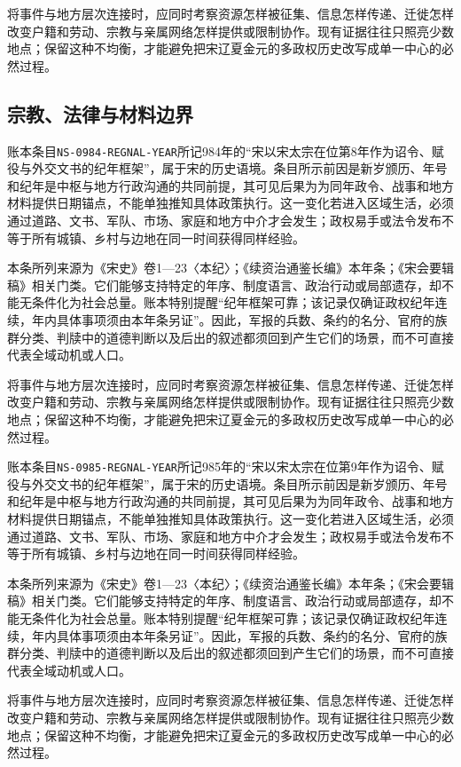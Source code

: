 将事件与地方层次连接时，应同时考察资源怎样被征集、信息怎样传递、迁徙怎样改变户籍和劳动、宗教与亲属网络怎样提供或限制协作。现有证据往往只照亮少数地点；保留这种不均衡，才能避免把宋辽夏金元的多政权历史改写成单一中心的必然过程。

\subsection{宗教、法律与材料边界}

账本条目\texttt{NS-0984-REGNAL-YEAR}所记984年的“宋以宋太宗在位第8年作为诏令、赋役与外交文书的纪年框架”，属于宋的历史语境。条目所示前因是新岁颁历、年号和纪年是中枢与地方行政沟通的共同前提，其可见后果为为同年政令、战事和地方材料提供日期锚点，不能单独推知具体政策执行。这一变化若进入区域生活，必须通过道路、文书、军队、市场、家庭和地方中介才会发生；政权易手或法令发布不等于所有城镇、乡村与边地在同一时间获得同样经验。

本条所列来源为《宋史》卷1—23〈本纪〉；《续资治通鉴长编》本年条；《宋会要辑稿》相关门类。它们能够支持特定的年序、制度语言、政治行动或局部遗存，却不能无条件化为社会总量。账本特别提醒“纪年框架可靠；该记录仅确证政权纪年连续，年内具体事项须由本年条另证”。因此，军报的兵数、条约的名分、官府的族群分类、判牍中的道德判断以及后出的叙述都须回到产生它们的场景，而不可直接代表全域动机或人口。

将事件与地方层次连接时，应同时考察资源怎样被征集、信息怎样传递、迁徙怎样改变户籍和劳动、宗教与亲属网络怎样提供或限制协作。现有证据往往只照亮少数地点；保留这种不均衡，才能避免把宋辽夏金元的多政权历史改写成单一中心的必然过程。

账本条目\texttt{NS-0985-REGNAL-YEAR}所记985年的“宋以宋太宗在位第9年作为诏令、赋役与外交文书的纪年框架”，属于宋的历史语境。条目所示前因是新岁颁历、年号和纪年是中枢与地方行政沟通的共同前提，其可见后果为为同年政令、战事和地方材料提供日期锚点，不能单独推知具体政策执行。这一变化若进入区域生活，必须通过道路、文书、军队、市场、家庭和地方中介才会发生；政权易手或法令发布不等于所有城镇、乡村与边地在同一时间获得同样经验。

本条所列来源为《宋史》卷1—23〈本纪〉；《续资治通鉴长编》本年条；《宋会要辑稿》相关门类。它们能够支持特定的年序、制度语言、政治行动或局部遗存，却不能无条件化为社会总量。账本特别提醒“纪年框架可靠；该记录仅确证政权纪年连续，年内具体事项须由本年条另证”。因此，军报的兵数、条约的名分、官府的族群分类、判牍中的道德判断以及后出的叙述都须回到产生它们的场景，而不可直接代表全域动机或人口。

将事件与地方层次连接时，应同时考察资源怎样被征集、信息怎样传递、迁徙怎样改变户籍和劳动、宗教与亲属网络怎样提供或限制协作。现有证据往往只照亮少数地点；保留这种不均衡，才能避免把宋辽夏金元的多政权历史改写成单一中心的必然过程。

